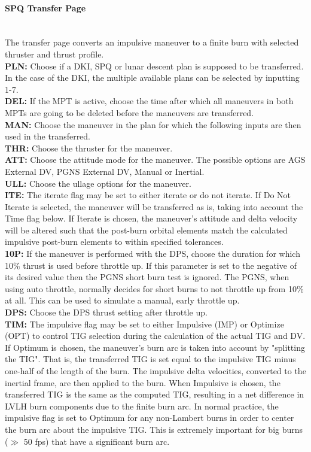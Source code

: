 \documentclass[11pt]{article} %
\begin{document}
\paragraph{SPQ Transfer Page}\mbox{} \\

The transfer page converts an impulsive maneuver to a finite burn with selected thruster and thrust profile.\\

\textbf{PLN:} Choose if a DKI, SPQ or lunar descent plan is supposed to be transferred. In the case of the DKI, the multiple available plans can be selected by inputting 1-7.\\
\textbf{DEL:} If the MPT is active, choose the time after which all maneuvers in both MPTs are going to be deleted before the maneuvers are transferred.\\
 \textbf{MAN:} Choose the maneuver in the plan for which the following inputs are then used in the transferred.\\
\textbf{THR:} Choose the thruster for the maneuver.\\
\textbf{ATT:} Choose the attitude mode for the maneuver. The possible options are AGS External DV, PGNS External DV, Manual or Inertial.\\
\textbf{ULL:} Choose the ullage options for the maneuver.\\
\textbf{ITE:} The iterate flag may be set to either iterate or do not iterate. If Do Not Iterate is selected, the maneuver will be transferred as is, taking into account the Time flag below. If Iterate is chosen, the maneuver's attitude and delta velocity will be altered such that the post-burn orbital elements match the calculated impulsive post-burn elements to within specified tolerances.\\
\textbf{10P:} If the maneuver is performed with the DPS, choose the duration for which 10\% thrust is used before throttle up. If this parameter is set to the negative of its desired value then the PGNS short burn test is ignored. The PGNS, when using auto throttle, normally decides for short burns to not throttle up from 10\% at all. This can be used to simulate a manual, early throttle up.\\
\textbf{DPS:} Choose the DPS thrust setting after throttle up.\\
\textbf{TIM:} The impulsive flag may be set to either Impulsive (IMP) or Optimize (OPT) to control TIG selection during the calculation of the actual TIG and DV. If Optimum is chosen, the maneuver's burn arc is taken into account by "splitting the TIG". That is, the transferred TIG is set equal to the impulsive TIG minus one-half of the length of the burn. The impulsive delta velocities, converted to the inertial frame, are then applied to the burn. When Impulsive is chosen, the transferred TIG is the same as the computed TIG, resulting in a net difference in LVLH burn components due to the finite burn arc. In normal practice, the impulsive flag is set to Optimum for any non-Lambert burns in order to center the burn arc about the impulsive TIG. This is extremely important for big burns ($\gg$ 50 fps) that have a significant burn arc.\\
\end{document}
